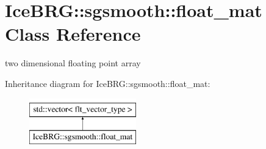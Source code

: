 \hypertarget{classIceBRG_1_1sgsmooth_1_1float__mat}{}\section{Ice\+B\+R\+G\+:\+:sgsmooth\+:\+:float\+\_\+mat Class Reference}
\label{classIceBRG_1_1sgsmooth_1_1float__mat}


two dimensional floating point array  


Inheritance diagram for Ice\+B\+R\+G\+:\+:sgsmooth\+:\+:float\+\_\+mat\+:\begin{figure}[H]
\begin{center}
\leavevmode
\includegraphics[height=2.000000cm]{classIceBRG_1_1sgsmooth_1_1float__mat}
\end{center}
\end{figure}
